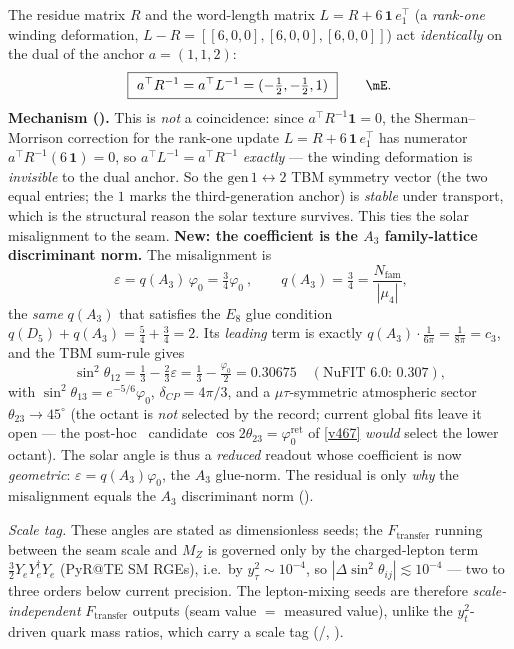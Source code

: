 \documentclass[11pt,a4paper]{article}
\newcommand{\Nfam}{N_{\mathrm{fam}}}
\newcommand{\phiz}{\varphi_0^{\mathrm{ret}}}
\theoremstyle{definition}
\begin{document}
\begin{keybox}
The residue matrix $R$ and the word-length matrix $L=R+6\,\mathbf 1\,e_1^\top$ (a \emph{rank-one} winding
deformation, $L{-}R=[[6,0,0],[6,0,0],[6,0,0]]$) act \emph{identically} on the dual of the anchor $a=(1,1,2)$:
\[
  \boxed{\ a^\top R^{-1}=a^\top L^{-1}=(-\tfrac12,-\tfrac12,1)\ }\qquad\mE .
\]
\textbf{Mechanism ().} This is \emph{not} a coincidence: since
$a^\top R^{-1}\mathbf 1=0$, the Sherman--Morrison correction for the rank-one update
$L=R+6\,\mathbf 1\,e_1^\top$ has numerator $a^\top R^{-1}(6\,\mathbf1)=0$, so $a^\top L^{-1}=a^\top R^{-1}$
\emph{exactly} --- the winding deformation is \emph{invisible} to the dual anchor. So the
$\mathrm{gen}\,1{\leftrightarrow}2$ TBM symmetry vector (the two equal entries; the $1$ marks the
third-generation anchor) is \emph{stable} under transport, which is the structural reason the solar texture
survives. This ties the solar misalignment to the seam. \textbf{New: the
coefficient is the $A_3$ family-lattice discriminant norm.} The misalignment is
\[
  \boxed{\ \varepsilon=q(A_3)\,\varphi_0=\tfrac34\varphi_0\ },\qquad
  q(A_3)=\tfrac34=\frac{\Nfam}{|\mu_4|},
\]
the \emph{same} $q(A_3)$ that satisfies the $E_8$ glue condition $q(D_5)+q(A_3)=\tfrac54+\tfrac34=2$. Its
\emph{leading} term is exactly $q(A_3)\cdot\tfrac1{6\pi}=\tfrac1{8\pi}=c_3$, and the TBM sum-rule gives
\[
  \sin^2\theta_{12}=\tfrac13-\tfrac23\varepsilon=\tfrac13-\tfrac{\varphi_0}{2}=0.30675
  \quad(\text{NuFIT 6.0: }0.307),
\]
with $\sin^2\theta_{13}=e^{-5/6}\varphi_0$, $\delta_{CP}=4\pi/3$, and a $\mu\tau$-symmetric atmospheric
sector $\theta_{23}\to45^\circ$ (the octant is \emph{not} selected by the record; current global fits leave it
open --- the post-hoc \mO\ candidate $\cos2\theta_{23}=\phiz$ of \vref{v467} \emph{would} select the lower octant).
The solar angle is thus a \emph{reduced} readout whose coefficient is now \emph{geometric}:
$\varepsilon=q(A_3)\varphi_0$, the $A_3$ glue-norm. The residual is only \emph{why} the misalignment equals
the $A_3$ discriminant norm
(\mC). \,

\emph{Scale tag.} These angles are stated as dimensionless seeds; the $F_{\mathrm{transfer}}$
running between the seam scale and $M_Z$ is governed only by the charged-lepton term
$\tfrac32 Y_e Y_e^\dagger Y_e$ (PyR@TE SM RGEs), i.e.\ by $y_\tau^2\sim10^{-4}$, so
$|\Delta\sin^2\theta_{ij}|\lesssim10^{-4}$ --- two to three orders below current precision.
The lepton-mixing seeds are therefore \emph{scale-independent} $F_{\mathrm{transfer}}$ outputs
(seam value $=$ measured value), unlike the $y_t^2$-driven quark mass ratios, which carry a
scale tag (\mE/\mC, ).
\end{keybox}
\end{document}
